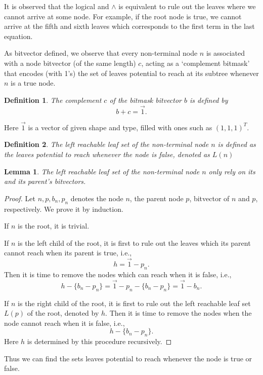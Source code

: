 \documentclass[UTF8]{article}
\newtheorem{lemma}{Lemma}
\newtheorem{defi}{Definition}
\newtheorem{proof}{Proof}[section]
\begin{document}
It is observed that the logical and $\wedge$ is equivalent to rule out the leaves
where we cannot arrive at some node.
For example, if the root node is true, we cannot arrive at the fifth and sixth leaves
which corresponds to the first term in the last equation.

As bitvector defined, we observe that every non-terminal node $n$ is associated with a node
bitvector (of the same length) $c$,
acting as a `complement bitmask' that encodes (with 1’s) the set of leaves potential
to reach at its subtree  whenever $n$ is a true node.
\begin{defi}
  The complement $c$ of the bitmask bitvector $b$ is defined by
     $$b+c=\vec{1}.$$
\end{defi}
Here $\vec{1}$ is  a vector of given shape and type,
filled with ones such as $(1,1,1)^T$.

\begin{defi}
  The left reachable leaf set of the non-terminal node $n$ is defined as the leaves potential to reach
whenever the node is false, denoted as $L(n)$
\end{defi}
\begin{lemma}
 The left reachable leaf set of the non-terminal node $n$ only rely on  its  and its parent's bitvectors.
\end{lemma}
\begin{proof}
Let $n, p, b_n, p_n$ denotes the node $n$, the parent node $p$, bitvector of $n$ and $p$, respectively.
We prove it by induction.

If $n$ is the root, it is trivial.

If $n$ is the left child of the root, it is first to rule out the leaves
which its parent  cannot reach when its parent is true, i.e.,
$$h=\vec{1}-p_n.$$
Then it is time to remove the nodes which can reach when it is false,
i.e., $$h-\{b_n-p_n\}=\vec{1}-p_n-\{b_n-p_n\}=\vec{1}-b_n.$$

If $n$ is the right child of the root,
it is first to rule out the left reachable leaf set $L(p)$ of the root, denoted by $h$.
Then it is time to remove the nodes when the node cannot reach
when it is false, i.e., $$h-\{b_n-p_n\}.$$
Here $h$ is determined by this procedure recursively.
\end{proof}

Thus we can find the sets leaves potential to reach
whenever the node is true or false.
\end{document}
